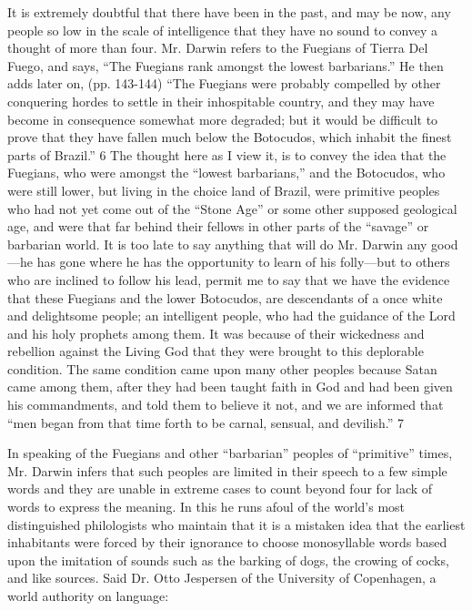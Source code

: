It is extremely doubtful that there have been in the past, and may be now, any people so low
in the scale of intelligence that they have no sound to convey a thought of more than four.
Mr. Darwin refers to the Fuegians of Tierra Del Fuego, and says, ``The Fuegians rank
amongst the lowest barbarians.'' He then adds later on, (pp. 143-144) ``The Fuegians were
probably compelled by other conquering hordes to settle in their inhospitable country, and
they may have become in consequence somewhat more degraded; but it would be difficult to
prove that they have fallen much below the Botocudos, which inhabit the finest parts of
Brazil.'' 6 The thought here as I view it, is to convey the idea that the Fuegians, who were
amongst the ``lowest barbarians,'' and the Botocudos, who were still lower, but living in the
choice land of Brazil, were primitive peoples who had not yet come out of the ``Stone Age''
or some other supposed geological age, and were that far behind their fellows in other parts
of the ``savage'' or barbarian world. It is too late to say anything that will do Mr. Darwin any
good—he has gone where he has the opportunity to learn of his folly—but to others who are
inclined to follow his lead, permit me to say that we have the evidence that these Fuegians
and the lower Botocudos, are descendants of a once white and delightsome people; an
intelligent people, who had the guidance of the Lord and his holy prophets among them. It
was because of their wickedness and rebellion against the Living God that they were brought
to this deplorable condition. The same condition came upon many other peoples because
Satan came among them, after they had been taught faith in God and had been given his
commandments, and told them to believe it not, and we are informed that ``men began from
that time forth to be carnal, sensual, and devilish.'' 7

In speaking of the Fuegians and other ``barbarian'' peoples of ``primitive'' times, Mr. Darwin
infers that such peoples are limited in their speech to a few simple words and they are unable
in extreme cases to count beyond four for lack of words to express the meaning. In this he
runs afoul of the world's most distinguished philologists who maintain that it is a mistaken
idea that the earliest inhabitants were forced by their ignorance to choose monosyllable
words based upon the imitation of sounds such as the barking of dogs, the crowing of cocks,
and like sources. Said Dr. Otto Jespersen of the University of Copenhagen, a world authority
on language:

